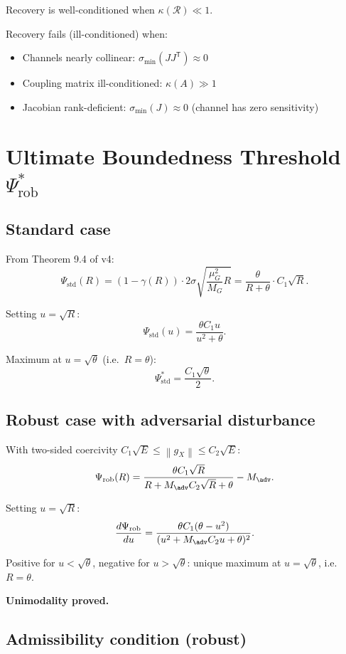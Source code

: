 \documentclass[11pt,a4paper]{article}
\theoremstyle{definition}
\newcommand{\T}{^{\mathsf{T}}}
\newcommand{\norm}[1]{\left\|#1\right\|}
\newcommand{\gX}{g_X}
\begin{document}
Recovery is well-conditioned when $\kappa(\mathcal{R}) \ll 1$.

Recovery fails (ill-conditioned) when:
\begin{itemize}
\item Channels nearly collinear: $\sigma_{\min}(JJ\T) \approx 0$
\item Coupling matrix ill-conditioned: $\kappa(A) \gg 1$
\item Jacobian rank-deficient: $\sigma_{\min}(J) \approx 0$ (channel has zero sensitivity)
\end{itemize}

\section{Ultimate Boundedness Threshold $\Psi^*_\mathrm{rob}$}

\subsection{Standard case}

From Theorem 9.4 of v4:
\[
\Psi_\mathrm{std}(R) = (1-\gamma(R))\cdot 2\sigma\sqrt{\frac{\mu_G^2}{M_G}R}
= \frac{\theta}{R+\theta}\cdot C_1\sqrt{R}.
\]

Setting $u = \sqrt{R}$:
\[
\Psi_\mathrm{std}(u) = \frac{\theta C_1 u}{u^2 + \theta}.
\]

Maximum at $u = \sqrt{\theta}$ (i.e.\ $R = \theta$):
\[
\Psi^*_\mathrm{std} = \frac{C_1\sqrt{\theta}}{2}.
\]

\subsection{Robust case with adversarial disturbance}

With two-sided coercivity $C_1\sqrt{E} \leq \norm{\gX} \leq C_2\sqrt{E}$:
\[
\Psi_\mathrm{rob}(R) = \frac{\theta C_1\sqrt{R}}{R + M_\adv C_2\sqrt{R} + \theta} - M_\adv.
\]

Setting $u = \sqrt{R}$:
\[
\frac{d\Psi_\mathrm{rob}}{du} = \frac{\theta C_1(\theta - u^2)}{(u^2 + M_\adv C_2 u + \theta)^2}.
\]

Positive for $u < \sqrt{\theta}$, negative for $u > \sqrt{\theta}$: unique maximum at $u = \sqrt{\theta}$, i.e.\ $R = \theta$.

\textbf{Unimodality proved.}

\subsection{Admissibility condition (robust)}
\end{document}
